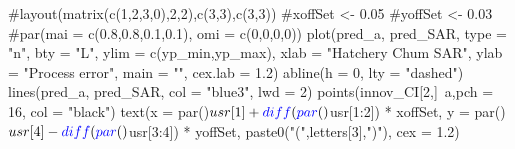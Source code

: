 \documentclass[11pt,]{article}
\newenvironment{Shaded}{}{}
\newcommand{\KeywordTok}[1]{\textcolor[rgb]{0.00,0.00,1.00}{#1}}
\newcommand{\DataTypeTok}[1]{#1}
\newcommand{\DecValTok}[1]{#1}
\newcommand{\FloatTok}[1]{#1}
\newcommand{\StringTok}[1]{\textcolor[rgb]{0.00,0.50,0.50}{#1}}
\newcommand{\CommentTok}[1]{\textcolor[rgb]{0.00,0.50,0.00}{#1}}
\newcommand{\OperatorTok}[1]{#1}
\newcommand{\NormalTok}[1]{#1}
\begin{document}
\begin{Shaded}
\begin{Highlighting}[]
\CommentTok{#layout(matrix(c(1,2,3,0),2,2),c(3,3),c(3,3))}
\CommentTok{#xoffSet <- 0.05}
\CommentTok{#yoffSet <- 0.03}
\CommentTok{#par(mai = c(0.8,0.8,0.1,0.1), omi = c(0,0,0,0))}
\KeywordTok{plot}\NormalTok{(pred_a, pred_SAR,}
     \DataTypeTok{type =} \StringTok{"n"}\NormalTok{,  }\DataTypeTok{bty =} \StringTok{"L"}\NormalTok{,}
     \DataTypeTok{ylim =} \KeywordTok{c}\NormalTok{(yp_min,yp_max),}
     \DataTypeTok{xlab =} \StringTok{"Hatchery Chum SAR"}\NormalTok{, }\DataTypeTok{ylab =} \StringTok{"Process error"}\NormalTok{, }\DataTypeTok{main =} \StringTok{""}\NormalTok{,}
     \DataTypeTok{cex.lab =} \FloatTok{1.2}\NormalTok{)}
\KeywordTok{abline}\NormalTok{(}\DataTypeTok{h =} \DecValTok{0}\NormalTok{, }\DataTypeTok{lty =} \StringTok{"dashed"}\NormalTok{)}
\KeywordTok{lines}\NormalTok{(pred_a, pred_SAR, }\DataTypeTok{col =} \StringTok{"blue3"}\NormalTok{, }\DataTypeTok{lwd =} \DecValTok{2}\NormalTok{)}
\KeywordTok{points}\NormalTok{(innov_CI[}\DecValTok{2}\NormalTok{,]}\OperatorTok{~}\NormalTok{a,}\DataTypeTok{pch =} \DecValTok{16}\NormalTok{, }\DataTypeTok{col =} \StringTok{"black"}\NormalTok{)}
\KeywordTok{text}\NormalTok{(}\DataTypeTok{x =} \KeywordTok{par}\NormalTok{()}\OperatorTok{$}\NormalTok{usr[}\DecValTok{1}\NormalTok{] }\OperatorTok{+}\StringTok{ }\KeywordTok{diff}\NormalTok{(}\KeywordTok{par}\NormalTok{()}\OperatorTok{$}\NormalTok{usr[}\DecValTok{1}\OperatorTok{:}\DecValTok{2}\NormalTok{]) }\OperatorTok{*}\StringTok{ }\NormalTok{xoffSet,}
\DataTypeTok{y =} \KeywordTok{par}\NormalTok{()}\OperatorTok{$}\NormalTok{usr[}\DecValTok{4}\NormalTok{] }\OperatorTok{-}\StringTok{ }\KeywordTok{diff}\NormalTok{(}\KeywordTok{par}\NormalTok{()}\OperatorTok{$}\NormalTok{usr[}\DecValTok{3}\OperatorTok{:}\DecValTok{4}\NormalTok{]) }\OperatorTok{*}\StringTok{ }\NormalTok{yoffSet,}
\KeywordTok{paste0}\NormalTok{(}\StringTok{"("}\NormalTok{,letters[}\DecValTok{3}\NormalTok{],}\StringTok{")"}\NormalTok{),}
\DataTypeTok{cex =} \FloatTok{1.2}\NormalTok{)}
\end{Highlighting}
\end{Shaded}
\end{document}
